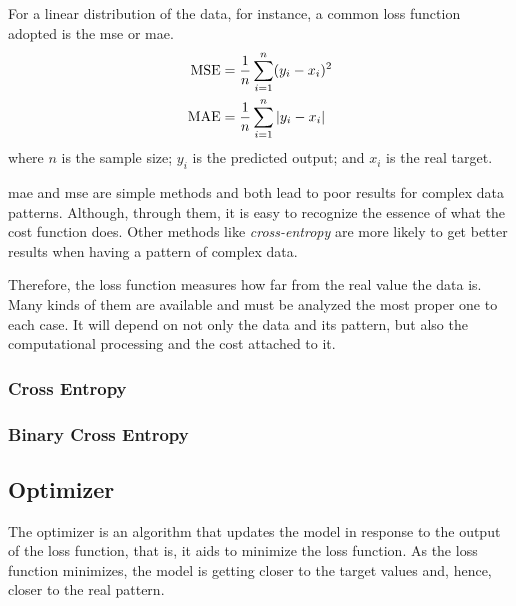 For a linear distribution of the data, for instance, a common loss function adopted is the \gls*{mse} \citep{bussab2017} or \gls*{mae}.
%
\begin{align}
    \text{MSE} &= \frac{1}{n} \sum_{i=1}^n (y_i - x_i)^2
    \label{eq:mse} \\
    \text{MAE} &= \frac{1}{n} \sum_{i=1}^n |y_i - x_i|
    \label{eq:mae}
\end{align}
%
where \(n\) is the sample size; \(y_i\) is the predicted output; and \(x_i\) is the real target.

\gls*{mae} and \gls*{mse} are simple methods and both lead to poor results for complex data patterns.
Although, through them, it is easy to recognize the essence of what the cost function does. 
Other methods like \emph{cross-entropy} are more likely to get better results when having a pattern of complex data.

Therefore, the loss function measures how far from the real value the data is. Many kinds of them are available and must be analyzed the most proper one to each case. 
It will depend on not only the data and its pattern, but also the computational processing and the cost attached to it.

\subsubsection*{Cross Entropy}

\subsubsection*{Binary Cross Entropy}

\subsection{Optimizer}

The optimizer is an algorithm that updates the model in response to the output of the loss function, that is, it aids to minimize the loss function. 
As the loss function minimizes, the model is getting closer to the target values and, hence, closer to the real pattern.

